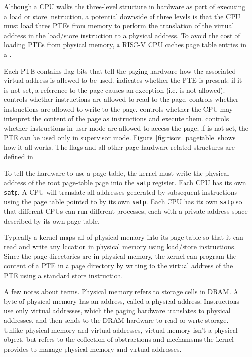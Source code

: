 Although a CPU walks the three-level structure in hardware as part of
executing a load or store instruction, a potential downside of three
levels is that the CPU must load three PTEs from memory to perform the
translation of the virtual address in the load/store instruction to a
physical address.  To avoid the cost of loading PTEs from physical
memory, a RISC-V CPU caches page table entries in a
.

Each PTE contains flag bits that tell the paging hardware
how the associated virtual address is allowed to be used.
indicates whether the PTE is present: if it is
not set, a reference to the page causes an exception (i.e. is not allowed).
controls whether instructions are allowed to 
read to the page.
controls whether instructions are allowed to 
write to the page.
controls whether the CPU may interpret the content
of the page as instructions and execute them.
controls whether instructions in user mode are allowed
to access the page;
if  is not set, the PTE can be used only in supervisor mode.
Figure~\ref{fig:riscv_pagetable}
shows how it all works.
The flags and all other page hardware-related structures are defined in

To tell the hardware to use a page table, the kernel must
write the physical address of the root page-table page into the 
\texttt{satp} register.
Each CPU has its own
\texttt{satp}.
A CPU will translate all addresses generated by subsequent instructions
using the page table pointed to by its own \texttt{satp}.
Each CPU has its own \texttt{satp} so that different CPUs can run
different processes, each with a private address space described by
its own page table.

Typically a kernel maps all of physical memory into its page table so
that it can read and write any location in physical memory using
load/store instructions.  Since the page directories are in physical
memory, the kernel can program the content of a PTE in a page
directory by writing to the virtual address of the PTE using a
standard store instruction.

A few notes about terms.
Physical memory refers to storage cells in DRAM.
A byte of physical memory has an address, called a physical address.
Instructions use only virtual addresses, which the
paging hardware translates to physical addresses, and then
sends to the DRAM hardware to read or write storage.
Unlike physical memory and virtual addresses, virtual memory isn't a physical object, but refers to the collection of abstractions and mechanisms
the kernel provides to manage physical memory and virtual
addresses.

